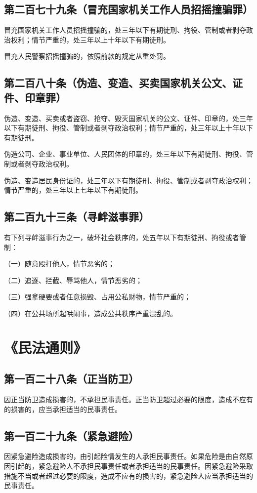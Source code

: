 \documentclass[utf-8,10pt]{ctexart}
\begin{document}
\subsection{第二百七十九条（冒充国家机关工作人员招摇撞骗罪）}
冒充国家机关工作人员招摇撞骗的，处三年以下有期徒刑、拘役、管制或者剥夺政治权利；情节严重的，处三年以上十年以下有期徒刑。

冒充人民警察招摇撞骗的，依照前款的规定从重处罚。
\subsection{第二百八十条（伪造、变造、买卖国家机关公文、证件、印章罪）}

伪造、变造、买卖或者盗窃、抢夺、毁灭国家机关的公文、证件、印章的，处三年以下有期徒刑、拘役、管制或者剥夺政治权利；情节严重的，处三年以上十年以下有期徒刑。

伪造公司、企业、事业单位、人民团体的印章的，处三年以下有期徒刑、拘役、管制或者剥夺政治权利。

伪造、变造居民身份证的，处三年以下有期徒刑、拘役、管制或者剥夺政治权利；情节严重的，处三年以上七年以下有期徒刑。
\subsection{第二百九十三条（寻衅滋事罪）}
有下列寻衅滋事行为之一，破坏社会秩序的，处五年以下有期徒刑、拘役或者管制：

（一）随意殴打他人，情节恶劣的；

（二）追逐、拦截、辱骂他人，情节恶劣的；

（三）强拿硬要或者任意损毁、占用公私财物，情节严重的；

（四）在公共场所起哄闹事，造成公共秩序严重混乱的。
\section{《民法通则》}
\subsection{第一百二十八条（正当防卫）}
因正当防卫造成损害的，不承担民事责任。正当防卫超过必要的限度，造成不应有的损害的，应当承担适当的民事责任。
\subsection{第一百二十九条（紧急避险）}
因紧急避险造成损害的，由引起险情发生的人承担民事责任。如果危险是由自然原因引起的，紧急避险人不承担民事责任或者承担适当的民事责任。因紧急避险采取措施不当或者超过必要的限度，造成不应有的损害的，紧急避险人应当承担适当的民事责任。
\end{document}
